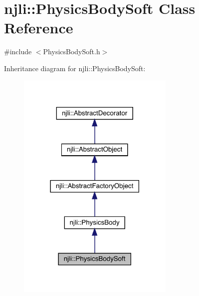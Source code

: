 \hypertarget{classnjli_1_1_physics_body_soft}{}\section{njli\+:\+:Physics\+Body\+Soft Class Reference}
\label{classnjli_1_1_physics_body_soft}


{\ttfamily \#include $<$Physics\+Body\+Soft.\+h$>$}



Inheritance diagram for njli\+:\+:Physics\+Body\+Soft\+:\nopagebreak
\begin{figure}[H]
\begin{center}
\leavevmode
\includegraphics[width=213pt]{classnjli_1_1_physics_body_soft__inherit__graph}
\end{center}
\end{figure}


